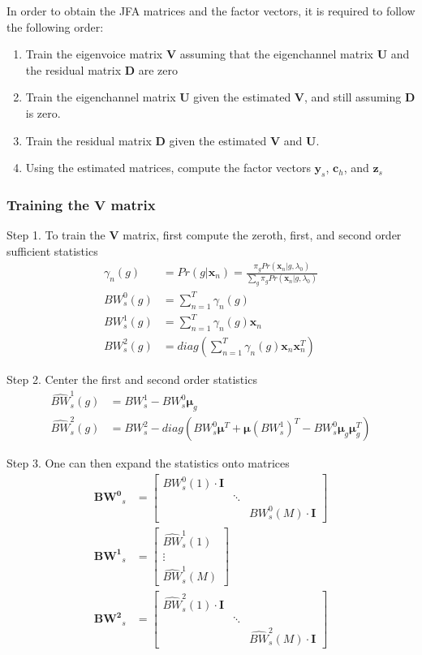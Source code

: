 In order to obtain the JFA matrices and the factor vectors, it is required to follow the following order:
\begin{enumerate}
    \item Train the eigenvoice matrix $\bm{V}$ assuming that the eigenchannel matrix $\bm{U}$ and the residual matrix $\bm{D}$ are zero
    \item Train the eigenchannel matrix $\bm{U}$ given the estimated $\bm{V}$, and still assuming $\bm{D}$ is zero.
    \item Train the residual matrix $\bm{D}$ given the estimated $\bm{V}$ and $\bm{U}$.
    \item Using the estimated matrices, compute the factor vectors $\bm{y}_s$, $\bm{c}_h$, and $\bm{z}_s$
\end{enumerate}

\subsubsection{Training the $\bm{V}$ matrix}
Step 1. To train the $\bm{V}$ matrix, first compute the zeroth, first, and second order sufficient statistics
\begin{align*}
    \gamma_n (g) &= Pr(g | \bm{x}_n) = \frac{\pi_g Pr(\bm{x}_n | g, \lambda_0)}{\sum_g \pi_g Pr(\bm{x}_n | g, \lambda_0)}\\
    BW^0_s (g) &= \sum_{n=1}^T \gamma_n(g) \\
    BW^1_s (g) &= \sum_{n=1}^T \gamma_n(g) \bm{x}_n \\
    BW^2_s (g) &= diag\left(\sum_{n=1}^T \gamma_n(g) \bm{x}_n \bm{x}_n^T \right)
\end{align*}

Step 2. Center the first and second order statistics
\begin{align*}
    \hat{BW}^1_s (g) &= BW^1_s - BW^0_s \bm{\mu}_g \\
    \hat{BW}^2_s (g) &= BW^2_s - diag(BW^0_s \bm{\mu}^T + \bm{\mu} (BW^1_s)^T - BW^0_s \bm{\mu}_g \bm{\mu}_g^T)
\end{align*}

Step 3. One can then expand the statistics onto matrices
\begin{align*}
    \bm{BW^0}_s &= \begin{bmatrix} BW^0_s(1) \cdot \bm{I} &  &  \\  & \ddots &  \\ & & BW^0_s(M) \cdot \bm{I} \end{bmatrix} \\
    \bm{BW^1}_s &= \begin{bmatrix} \hat{BW}^1_s(1) \\ \vdots \\ \hat{BW}^1_s(M) \end{bmatrix} \\
    \bm{BW^2}_s &= \begin{bmatrix} \hat{BW}^2_s(1) \cdot \bm{I} &  &  \\  & \ddots &  \\ & & \hat{BW}^2_s(M) \cdot \bm{I} \end{bmatrix}
\end{align*}

